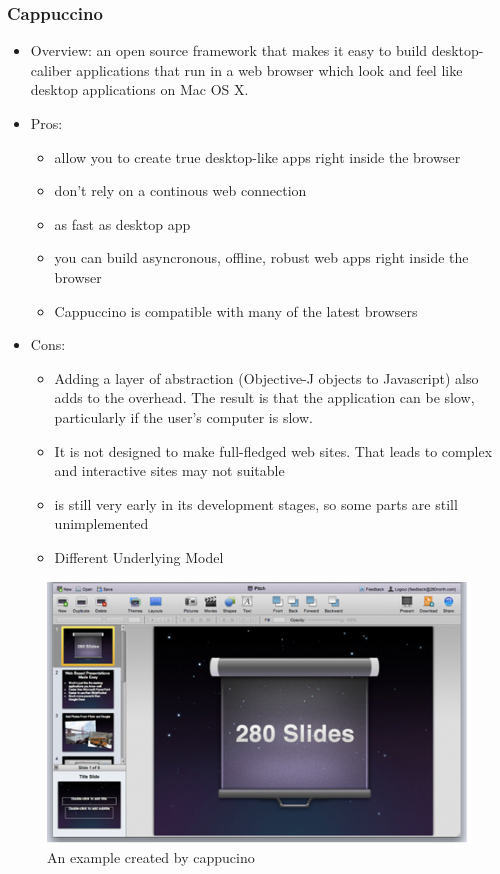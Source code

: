 \documentclass[14pt,a4paper]{extreport}
\begin{document}
		\subsubsection{Cappuccino}
			\begin{itemize}
				\item Overview: an open source framework that makes it easy to build desktop-caliber applications that run in a web browser which look and feel like desktop applications on Mac OS X.
				\item Pros: 
					\begin{itemize}
						\item allow you to create true desktop-like apps right inside the browser
						\item don’t rely on a continous web connection
						\item as fast as desktop app
						\item you can build asyncronous, offline, robust web apps right inside the browser
						\item Cappuccino is compatible with many of the latest browsers
					
					\end{itemize}
				\item Cons:
					\begin{itemize}
						\item Adding a layer of abstraction (Objective-J objects to Javascript) also adds to the overhead. The result is that the application can be slow, particularly if the user's computer is slow.
						\item It is not designed to make full-fledged web sites. That leads to complex and interactive sites may not suitable
						\item is still very early in its development stages, so some parts are still unimplemented
						\item Different Underlying Model
					\end{itemize}
			\end{itemize}
			\begin{figure}
				\begin{center}
				\includegraphics[scale=1.3]{Cappuccino1.png}
				\caption{An example created by cappucino}
				\end{center}
			\end{figure}
\end{document}
